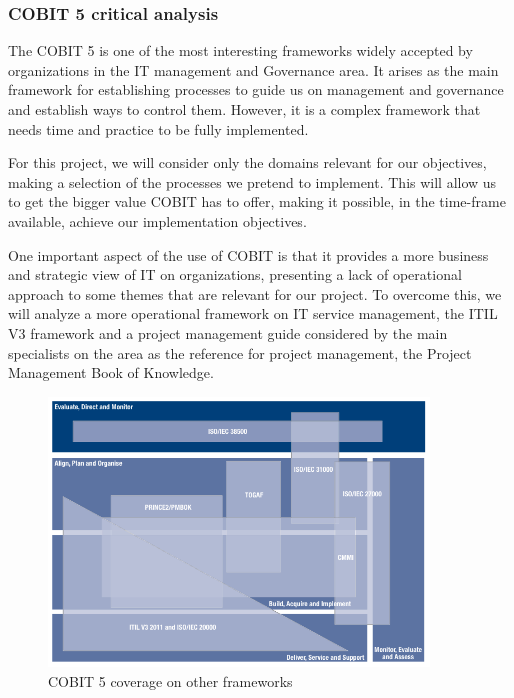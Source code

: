 \subsubsection{COBIT 5 critical analysis}

The COBIT 5 is one of the most interesting frameworks widely accepted by organizations in the IT management and Governance area. It arises as the main framework for establishing processes to guide us on management and governance and establish ways to control them. However, it is a complex framework that needs time and practice to be fully implemented.\par
For this project, we will consider only the domains relevant for our objectives, making a selection of the processes we pretend to implement. This will allow us to get the bigger value COBIT has to offer, making it possible, in the time-frame available, achieve our implementation objectives.\par
One important aspect of the use of COBIT is that it provides a more business and strategic view of IT on organizations, presenting a lack of operational approach to some themes that are relevant for our project. To overcome this, we will analyze a more operational framework on IT service management, the ITIL V3 framework\cite{itilIntro,itilSS,itilST,itilSD,itilSO,itilCSI} and a project management guide considered by the main specialists on the area as the reference for project management, the Project Management Book of Knowledge\cite{pmbok5}.\par

\begin{figure}
\centering
\includegraphics[width=0.9\textwidth]{img/COBITOtherFrameworks.png}
\caption{COBIT 5 coverage on other frameworks}
\end{figure}

